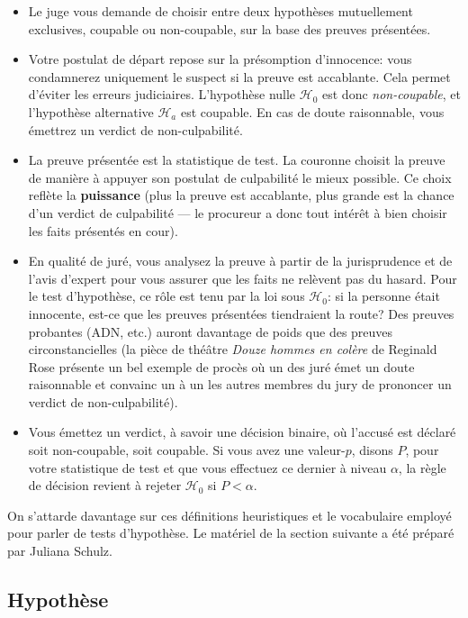 \documentclass[
  11pt,
  letterpaper,
]{book}
\providecommand{\tightlist}{%
  \setlength{\itemsep}{0pt}\setlength{\parskip}{0pt}}
\begin{document}
\begin{itemize}
\tightlist
\item
  Le juge vous demande de choisir entre deux hypothèses mutuellement exclusives, coupable ou non-coupable, sur la base des preuves présentées.
\item
  Votre postulat de départ repose sur la présomption d'innocence: vous condamnerez uniquement le suspect si la preuve est accablante. Cela permet d'éviter les erreurs judiciaires. L'hypothèse nulle \(\mathscr{H}_0\) est donc \emph{non-coupable}, et l'hypothèse alternative \(\mathscr{H}_a\) est coupable. En cas de doute raisonnable, vous émettrez un verdict de non-culpabilité.
\item
  La preuve présentée est la statistique de test. La couronne choisit la preuve de manière à appuyer son postulat de culpabilité le mieux possible. Ce choix reflète la \textbf{puissance} (plus la preuve est accablante, plus grande est la chance d'un verdict de culpabilité --- le procureur a donc tout intérêt à bien choisir les faits présentés en cour).
\item
  En qualité de juré, vous analysez la preuve à partir de la jurisprudence et de l'avis d'expert pour vous assurer que les faits ne relèvent pas du hasard. Pour le test d'hypothèse, ce rôle est tenu par la loi sous \(\mathscr{H}_0\): si la personne était innocente, est-ce que les preuves présentées tiendraient la route? Des preuves probantes (ADN, etc.) auront davantage de poids que des preuves circonstancielles (la pièce de théâtre \emph{Douze hommes en colère} de Reginald Rose présente un bel exemple de procès où un des juré émet un doute raisonnable et convainc un à un les autres membres du jury de prononcer un verdict de non-culpabilité).
\item
  Vous émettez un verdict, à savoir une décision binaire, où l'accusé est déclaré soit non-coupable, soit coupable. Si vous avez une valeur-\(p\), disons \(P\), pour votre statistique de test et que vous effectuez ce dernier à niveau \(\alpha\), la règle de décision revient à rejeter \(\mathscr{H}_0\) si \(P < \alpha\).
\end{itemize}

On s'attarde davantage sur ces définitions heuristiques et le vocabulaire employé pour parler de tests d'hypothèse. Le matériel de la section suivante a été préparé par Juliana Schulz.

\hypertarget{hypothuxe8se}{%
\subsection{Hypothèse}\label{hypothuxe8se}}
\end{document}
